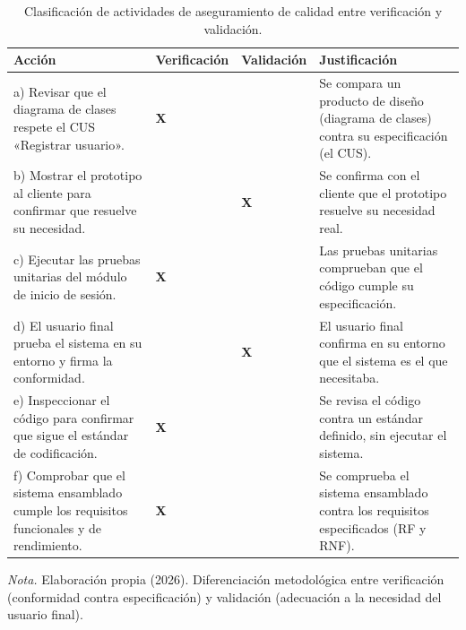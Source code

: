\begin{table}[H]
  \centering
  \small
  \caption{Clasificación de actividades de aseguramiento de calidad entre verificación y validación.}
  \label{tab:pruebas_verificacion_validacion}
  \begin{tabularx}{\linewidth}{|L{4.6cm}|C{2.3cm}|C{2.0cm}|Y|}
    \hline
    \textbf{Acción} & \textbf{Verificación} & \textbf{Validación} & \textbf{Justificación} \\ \hline
    a) Revisar que el diagrama de clases respete el CUS «Registrar usuario». & \textbf{X} & &
      Se compara un producto de diseño (diagrama de clases) contra su especificación (el CUS). \\ \hline
    b) Mostrar el prototipo al cliente para confirmar que resuelve su necesidad. & & \textbf{X} &
      Se confirma con el cliente que el prototipo resuelve su necesidad real. \\ \hline
    c) Ejecutar las pruebas unitarias del módulo de inicio de sesión. & \textbf{X} & &
      Las pruebas unitarias comprueban que el código cumple su especificación. \\ \hline
    d) El usuario final prueba el sistema en su entorno y firma la conformidad. & & \textbf{X} &
      El usuario final confirma en su entorno que el sistema es el que necesitaba. \\ \hline
    e) Inspeccionar el código para confirmar que sigue el estándar de codificación. & \textbf{X} & &
      Se revisa el código contra un estándar definido, sin ejecutar el sistema. \\ \hline
    f) Comprobar que el sistema ensamblado cumple los requisitos funcionales y de rendimiento. & \textbf{X} & &
      Se comprueba el sistema ensamblado contra los requisitos especificados (RF y RNF). \\ \hline
  \end{tabularx}
  \par\vspace{0.2cm}
  {\raggedright \small \emph{Nota.} Elaboración propia (2026). Diferenciación metodológica entre verificación (conformidad contra especificación) y validación (adecuación a la necesidad del usuario final).\par}
\end{table}
